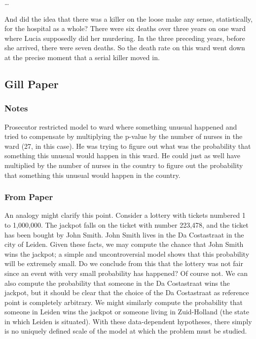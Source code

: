 \documentclass[letterpaper, landscape]{exam}
\begin{document}
  \dots

  And did the idea that there was a killer on the loose make any sense,
  statistically, for the hospital as a whole? There were six deaths over three
  years on one ward where Lucia supposedly did her murdering. In the three
  preceding years, before she arrived, there were seven deaths. So the death
  rate on this ward went down at the precise moment that a serial killer moved
  in.


  \subsection{Gill Paper} %
  
  \subsubsection{Notes} %
  
  Prosecutor restricted model to ward where something unusual happened and tried
  to compensate by multiplying the p-value by the number of nurses in the ward
  (27, in this case). He was trying to figure out what was the probability that
  something this unusual would happen in this ward. He could just as well have
  multiplied by the number of nurses in the country to figure out the
  probability that something this unusual would happen in the country.

  \subsubsection{From Paper} %

  An analogy might clarify this point. Consider a lottery with tickets
  numbered 1 to 1,000,000. The jackpot falls on the ticket with number
  223,478, and the ticket has been bought by John Smith. John Smith lives in
  the Da Costastraat in the city of Leiden. Given these facts, we may compute
  the chance that John Smith wins the jackpot; a simple and uncontroversial
  model shows that this probability will be extremely small. Do we conclude
  from this that the lottery was not fair since an event with very small
  probability has happened? Of course not. We can also compute the probability
  that someone in the Da Costastraat wins the jackpot, but it should be clear
  that the choice of the Da Costastraat as reference point is completely
  arbitrary. We might similarly compute the probability that someone in Leiden
  wins the jackpot or someone living in Zuid-Holland (the state in which
  Leiden is situated). With these data-dependent hypotheses, there simply is
  no uniquely defined scale of the model at which the problem must be studied.
\end{document}
